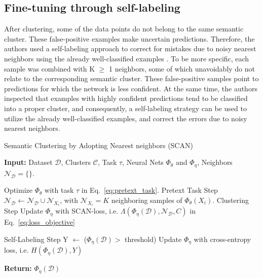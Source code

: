 \subsection{ Fine-tuning through self-labeling} 

After clustering, some of the data points do not belong to the same semantic cluster. These false-positive examples make uncertain predictions. Therefore, the authors used a self-labeling approach to correct for mistakes due to noisy nearest neighbors 
using the already well-classified examples  \cite{sohn2020fixmatch}. To be more specific, each sample was combined with K $\geq$ 1 neighbors, some of which unavoidably do not relate to the corresponding semantic cluster. These false-positive samples point to predictions for which the network is less confident.  At the same time, the authors inspected that examples with highly confident predictions tend to be classified into a proper cluster, and consequently, a self-labeling strategy can be used to utilize the already well-classified examples, and correct the errors due to noisy nearest neighbors.
 

\begin{algorithm}[H]
\small{
\caption{Semantic Clustering by Adopting Nearest neighbors (SCAN)}
\label{alg: algorithm}
\begin{algorithmic}
\State \textbf{Input:} Dataset $\mathcal{D}$, Clusters $\mathcal{C}$, Task $\tau$, Neural Nets $\Phi_\theta$ and $\Phi_\eta$, Neighbors $\mathcal{N}_\mathcal{D}=\{\}$.

\State Optimize $\Phi_\theta$ with task $\tau$ in Eq.~\ref{eq:pretext_task}. \Comment Pretext Task Step 
\State $\mathcal{N}_\mathcal{D} \leftarrow \mathcal{N}_{\mathcal{D}} \cup \mathcal{N}_{X_i}$, with $\mathcal{N}_{X_i} = K$ neighboring samples of $\Phi_\theta(X_i)$.
\EndFor
{} \Comment Clustering Step
\State Update $\Phi_\eta$ with SCAN-loss, i.e. $\Lambda(\Phi_\eta(\mathcal{D}), \mathcal{N}_{\mathcal{D}}, C)$ in Eq.~\ref{eq:loss_objective}
\EndWhile 

 \Comment Self-Labeling Step
\State Y $\leftarrow$ ($\Phi_\eta(\mathcal{D}) >$ threshold)   
\State Update $\Phi_\eta$ with cross-entropy loss, i.e. $H(\Phi_\eta(\mathcal{D}), Y)$
\EndWhile

\State \textbf{Return:} $\Phi_\eta(\mathcal{D})$ 
\end{algorithmic}
}
\end{algorithm}
